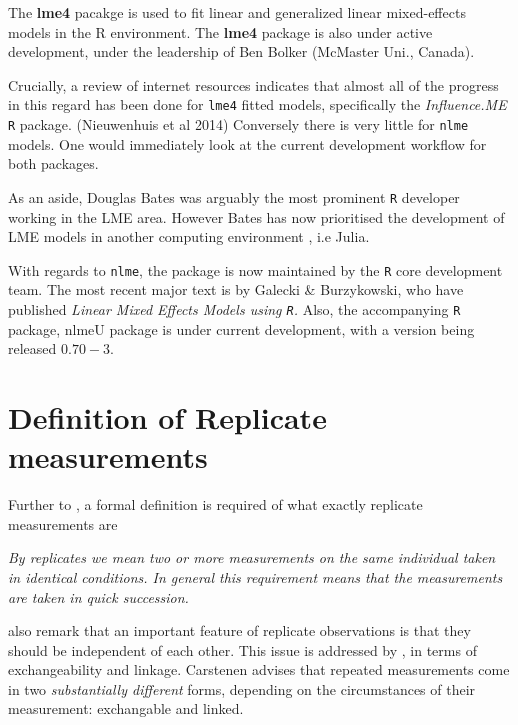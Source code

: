 \documentclass[12pt, a4paper]{report}
\theoremstyle{plain}
\theoremstyle{definition}
\theoremstyle{remark}
\begin{document}
	
	The \textbf{lme4} pacakge is used to fit linear and generalized linear mixed-effects models in the R environment.
	The \textbf{lme4} package is also under active development, under the leadership of Ben Bolker (McMaster Uni., Canada).
	
	
	Crucially, a review of internet resources indicates that almost all of the progress in this regard has been done for \texttt{lme4} fitted models, specifically the \textit{Influence.ME} \texttt{R} package. (Nieuwenhuis et al 2014)
	Conversely there is very little for \texttt{nlme} models. One would immediately look at the current development workflow for both packages.
	
	
	As an aside, Douglas Bates was arguably the most prominent \texttt{R} developer working in the LME area. 
	However Bates has now prioritised the development of LME models in another computing environment , i.e Julia. 
	
	
	With regards to \texttt{nlme}, the package is now maintained by the \texttt{R} core development team. The most recent major text is by Galecki \& Burzykowski, who have published \textit{ Linear Mixed Effects Models using \texttt{R}. }
	Also, the accompanying \texttt{R} package, nlmeU package is under current development, with a version being released $0.70-3$.
	
	
	


	\section{Definition of Replicate measurements}
	Further to \citet{BA99}, a formal definition is required of what exactly replicate measurements are
	
	\emph{By replicates we mean two or more measurements on the same
		individual taken in identical conditions. In general this requirement means that the
		measurements are taken in quick succession.}
	
	\citet{BA99} also remark that an important feature of replicate observations is that they should be independent
	of each other. This issue is addressed by \citet{BXC2010}, in terms of exchangeability and linkage. Carstenen advises that repeated measurements come in two \emph{substantially different} forms, depending on the circumstances of their measurement: exchangable and linked.
\end{document}

